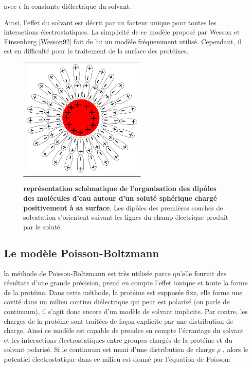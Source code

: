 avec $ \epsilon $ la constante diélectrique du solvant.

Ainsi, l'effet du solvant est décrit par un facteur unique pour toutes les interactions électrostatiques. La simplicité de ce modèle proposé par Wesson et Einsenberg \ref{Wesson92} fait de lui un modèle fréquemment utilisé. Cependant, il est en difficulté pour le traitement de la surface des protéines.


   \begin{figure}[!htbp]
     \centering
     \begin{tabular}{c}
       \includegraphics[width=6cm]{figure/ecrantage.png} &
     \end{tabular}
     
     \caption{\textbf{représentation schématique de l'organisation des dipôles des molécules d'eau autour d'un soluté sphérique chargé positivement à sa surface}. Les dipôles des premières couches de solvatation s'orientent suivant les lignes du champ électrique produit par le soluté.}
\label{graph:ecrantage}
   \end{figure}
   


\subsection{Le modèle Poisson-Boltzmann}
la méthode de Poisson-Boltzmann est très utilisée parce qu'elle fournit des résultats d'une grande précision, prend en compte l'effet ionique et toute la forme de la protéine. Dans cette méthode, la protéine est supposée fixe, elle forme une cavité dans un milieu continu diélectrique qui peut est polarisé (on parle de continuum), il s'agit donc encore d'un modèle de solvant implicite. Par contre, les charges de la protéine sont traitées de façon explicite par une distribution de charge. Ainsi ce modèle est capable de prendre en compte l'écrantage du solvant et les interactions électrostatiques entre groupes chargés de la protéine et du solvant polarisé. Si le continuum est muni d'une distribution de charge $\rho$ , alors le potentiel électrostatique dans ce milieu est donné par l'équation de Poisson:

